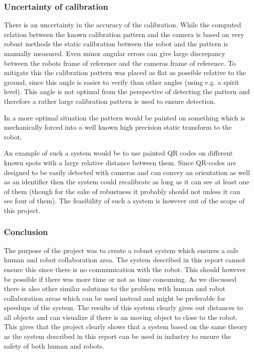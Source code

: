 \subsubsection{Uncertainty of calibration}
There is an uncertainty in the accuracy of the calibration. While the computed relation between the known calibration pattern and the camera is based on very robust methods the static calibration between the robot and the pattern is manually measured. Even minor angular errors can give large discrepancy between the robots frame of reference and the cameras frame of reference. To mitigate this the calibration pattern was placed as flat as possible relative to the ground, since this angle is easier to verify than other angles (using e.g. a spirit level). This angle is not optimal from the perspective of detecting the pattern and therefore a rather large calibration pattern is used to ensure detection.

In a more optimal situation the pattern would be painted on something which is mechanically forced into a well known high precision static transform to the robot.

An example of such a system would be to use painted QR codes on different known spots with a large relative distance between them. Since QR-codes are designed to be easily detected with cameras and can convey an orientation as well as an identifier then the system could recalibrate as long as it can see at least one of them (though for the sake of robustness it probably should not unless it can see four of them). The feasibility of such a system is however out of the scope of this project.

\subsubsection{Conclusion}
The purpose of the project was to create a robust system which ensures a safe human and robot collaboration area. The system described in this report cannot ensure this since there is no communication with the robot. This should however be possible if there was more time or not as time consuming. As we discussed there is also other similar solutions to the problem with human and robot collaboration areas which can be used instead and might be preferable for speedups of the system. The results of this system clearly gives out distances to all objects and can visualize if there is an moving object to close to the robot. This gives that the project clearly shows that a system based on the same theory as the system described in this report can be used in industry to ensure the safety of both human and robots. 